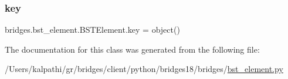 \subsubsection{\texorpdfstring{key}{key}}
{\footnotesize\ttfamily bridges.\+bst\+\_\+element.\+B\+S\+T\+Element.\+key = object()\hspace{0.3cm}{\ttfamily [static]}}



The documentation for this class was generated from the following file\+:\begin{DoxyCompactItemize}
\item 
/\+Users/kalpathi/gr/bridges/client/python/bridges18/bridges/\mbox{\hyperlink{bst__element_8py}{bst\+\_\+element.\+py}}\end{DoxyCompactItemize}
